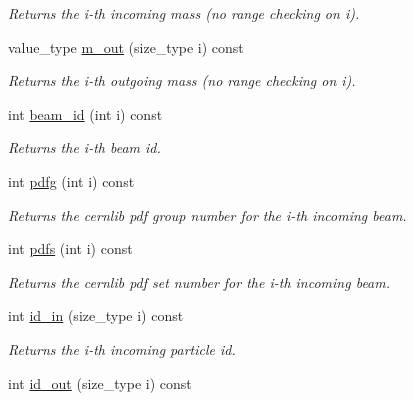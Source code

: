 \begin{DoxyCompactItemize}
\begin{DoxyCompactList}\small\item\em Returns the i-\/th incoming mass (no range checking on i). \end{DoxyCompactList}\item 
\hypertarget{a00210_a840b7af8f27e9f671ef7661e23a10204}{value\-\_\-type \hyperlink{a00210_a840b7af8f27e9f671ef7661e23a10204}{m\-\_\-out} (size\-\_\-type i) const }\label{a00210_a840b7af8f27e9f671ef7661e23a10204}

\begin{DoxyCompactList}\small\item\em Returns the i-\/th outgoing mass (no range checking on i). \end{DoxyCompactList}\item 
\hypertarget{a00210_a69d39c68698b14c8fd5abfd162b8f8ef}{int \hyperlink{a00210_a69d39c68698b14c8fd5abfd162b8f8ef}{beam\-\_\-id} (int i) const }\label{a00210_a69d39c68698b14c8fd5abfd162b8f8ef}

\begin{DoxyCompactList}\small\item\em Returns the i-\/th beam id. \end{DoxyCompactList}\item 
\hypertarget{a00210_ac24c26a9e3c14c3b650f077a595c571b}{int \hyperlink{a00210_ac24c26a9e3c14c3b650f077a595c571b}{pdfg} (int i) const }\label{a00210_ac24c26a9e3c14c3b650f077a595c571b}

\begin{DoxyCompactList}\small\item\em Returns the cernlib pdf group number for the i-\/th incoming beam. \end{DoxyCompactList}\item 
\hypertarget{a00210_a2ca5e23a439422f77d49981a09072dee}{int \hyperlink{a00210_a2ca5e23a439422f77d49981a09072dee}{pdfs} (int i) const }\label{a00210_a2ca5e23a439422f77d49981a09072dee}

\begin{DoxyCompactList}\small\item\em Returns the cernlib pdf set number for the i-\/th incoming beam. \end{DoxyCompactList}\item 
\hypertarget{a00210_ad7eb70375dff438f73ebc5f79919279a}{int \hyperlink{a00210_ad7eb70375dff438f73ebc5f79919279a}{id\-\_\-in} (size\-\_\-type i) const }\label{a00210_ad7eb70375dff438f73ebc5f79919279a}

\begin{DoxyCompactList}\small\item\em Returns the i-\/th incoming particle id. \end{DoxyCompactList}\item 
\hypertarget{a00210_aaa6968384f596478f21840491ceabad4}{int \hyperlink{a00210_aaa6968384f596478f21840491ceabad4}{id\-\_\-out} (size\-\_\-type i) const }\label{a00210_aaa6968384f596478f21840491ceabad4}


\end{DoxyCompactItemize}
